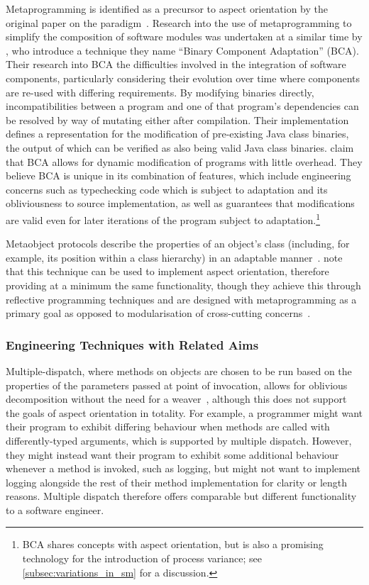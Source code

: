 Metaprogramming is identified as a precursor to aspect orientation by the
original paper on the paradigm~\cite{kiczales1997aspect}. Research into the use
of metaprogramming to simplify the composition of software modules was
undertaken at a similar time by \citet{keller1998binary}, who introduce a
technique they name ``Binary Component Adaptation'' (BCA). Their research into
BCA the difficulties involved in the integration of software components,
particularly considering their evolution over time where components are re-used
with differing requirements. By modifying binaries directly, incompatibilities
between a program and one of that program's dependencies can be resolved by way
of mutating either after compilation. Their implementation defines a
representation for the modification of pre-existing Java class binaries, the
output of which can be verified as also being valid Java class binaries.
 claim that BCA allows for dynamic modification of
programs with little overhead. They believe BCA is unique in its combination of
features, which include engineering concerns such as typechecking code which is
subject to adaptation and its obliviousness to source implementation, as well as
guarantees that modifications are valid even for later iterations of the program
subject to adaptation.\footnote{BCA shares concepts with aspect orientation, but
  is also a promising technology for the introduction of process variance; see
  \cref{subsec:variations_in_sm} for a discussion.}

Metaobject protocols describe the properties of an object's class (including,
for example, its position within a class hierarchy) in an adaptable
manner~\cite{kiczales1991art}. \citet{espakaspect} note that this technique can
be used to implement aspect orientation, therefore providing at a minimum the
same functionality, though they achieve this through reflective programming
techniques and are designed with metaprogramming as a primary goal as opposed to
modularisation of cross-cutting
concerns~\cite{kiczales1991art,sullivan2001aspect}.

\subsubsection{Engineering Techniques with Related Aims}
\label{engineering_techniques_as_aop_alternative}

Multiple-dispatch, where methods on objects are chosen to be run based on the
properties of the parameters passed at point of invocation, allows for oblivious
decomposition without the need for a weaver~\cite{dozsa2008lisp}, although this
does not support the goals of aspect orientation in totality. For example, a
programmer might want their program to exhibit differing behaviour when methods
are called with differently-typed arguments, which is supported by multiple
dispatch. However, they might instead want their program to exhibit some
additional behaviour whenever a method is invoked, such as logging, but might
not want to implement logging alongside the rest of their method implementation
for clarity or length reasons. Multiple dispatch therefore offers comparable but
different functionality to a software engineer.

